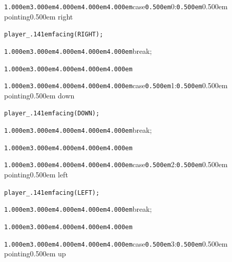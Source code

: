 \documentclass[12pt]{article}
\begin{document}
\noindent
\tt{}

\noindent
{}{\tt\mc \kern1.000em}{\tt\mc \kern3.000em}{\tt\mc \kern4.000em}{\tt\mc \kern4.000em}{\tt\mc \kern4.000em}case{\tt\mc \kern0.500em}0:{\tt\mc \kern0.500em}\rm\mc {\tt /}{\tt /}\kern0.500em pointing\kern0.500em right

\noindent
\tt\mc {\tt\mc \kern1.000em}{\tt\mc \kern3.000em}{\tt\mc \kern4.000em}{\tt\mc \kern4.000em}{\tt\mc \kern4.000em}player{\tt\_\kern.141em}facing(RIGHT);

\noindent
{}{\tt\mc \kern1.000em}{\tt\mc \kern3.000em}{\tt\mc \kern4.000em}{\tt\mc \kern4.000em}{\tt\mc \kern4.000em}break;

\noindent
{}{\tt\mc \kern1.000em}{\tt\mc \kern3.000em}{\tt\mc \kern4.000em}{\tt\mc \kern4.000em}{\tt\mc \kern4.000em}

\noindent
{}{\tt\mc \kern1.000em}{\tt\mc \kern3.000em}{\tt\mc \kern4.000em}{\tt\mc \kern4.000em}{\tt\mc \kern4.000em}case{\tt\mc \kern0.500em}1:{\tt\mc \kern0.500em}\rm\mc {\tt /}{\tt /}\kern0.500em pointing\kern0.500em down

\noindent
\tt\mc {\tt\mc \kern1.000em}{\tt\mc \kern3.000em}{\tt\mc \kern4.000em}{\tt\mc \kern4.000em}{\tt\mc \kern4.000em}player{\tt\_\kern.141em}facing(DOWN);

\noindent
{}{\tt\mc \kern1.000em}{\tt\mc \kern3.000em}{\tt\mc \kern4.000em}{\tt\mc \kern4.000em}{\tt\mc \kern4.000em}break;

\noindent
{}{\tt\mc \kern1.000em}{\tt\mc \kern3.000em}{\tt\mc \kern4.000em}{\tt\mc \kern4.000em}{\tt\mc \kern4.000em}

\noindent
{}{\tt\mc \kern1.000em}{\tt\mc \kern3.000em}{\tt\mc \kern4.000em}{\tt\mc \kern4.000em}{\tt\mc \kern4.000em}case{\tt\mc \kern0.500em}2:{\tt\mc \kern0.500em}\rm\mc {\tt /}{\tt /}\kern0.500em pointing\kern0.500em left

\noindent
\tt\mc {\tt\mc \kern1.000em}{\tt\mc \kern3.000em}{\tt\mc \kern4.000em}{\tt\mc \kern4.000em}{\tt\mc \kern4.000em}player{\tt\_\kern.141em}facing(LEFT);

\noindent
{}{\tt\mc \kern1.000em}{\tt\mc \kern3.000em}{\tt\mc \kern4.000em}{\tt\mc \kern4.000em}{\tt\mc \kern4.000em}break;

\noindent
{}{\tt\mc \kern1.000em}{\tt\mc \kern3.000em}{\tt\mc \kern4.000em}{\tt\mc \kern4.000em}{\tt\mc \kern4.000em}

\noindent
{}{\tt\mc \kern1.000em}{\tt\mc \kern3.000em}{\tt\mc \kern4.000em}{\tt\mc \kern4.000em}{\tt\mc \kern4.000em}case{\tt\mc \kern0.500em}3:{\tt\mc \kern0.500em}\rm\mc {\tt /}{\tt /}\kern0.500em pointing\kern0.500em up
\end{document}
